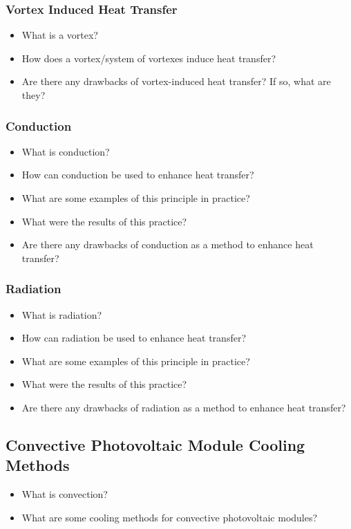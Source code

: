 \subsubsection{Vortex Induced Heat Transfer}
\begin{itemize}
    \item What is a vortex?
    \item How does a vortex/system of vortexes induce heat transfer?
    \item Are there any drawbacks of vortex-induced heat transfer? If so, what are they?
\end{itemize}

\subsubsection{Conduction}
\begin{itemize}
    \item What is conduction?
    \item How can conduction be used to enhance heat transfer?
    \item What are some examples of this principle in practice?
    \item What were the results of this practice?
    \item Are there any drawbacks of conduction as a method to enhance heat transfer?
\end{itemize}

\subsubsection{Radiation}
\begin{itemize}
    \item What is radiation?
    \item How can radiation be used to enhance heat transfer?
    \item What are some examples of this principle in practice?
    \item What were the results of this practice?
    \item Are there any drawbacks of radiation as a method to enhance heat transfer?
\end{itemize}

\subsection{Convective Photovoltaic Module Cooling Methods}
\begin{itemize}
    \item What is convection?
    \item What are some cooling methods for convective photovoltaic modules?
\end{itemize}

